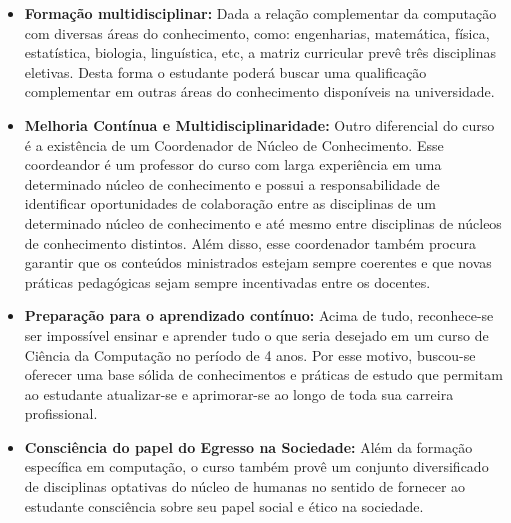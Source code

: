 \begin{itemize}

\item \textbf{Formação multidisciplinar:} Dada a relação complementar da computação com diversas áreas do conhecimento, como: engenharias, matemática, física, estatística, biologia, linguística, etc, a matriz curricular prevê três disciplinas eletivas. Desta forma o estudante poderá buscar uma qualificação complementar em outras áreas do conhecimento disponíveis na universidade.


\item \textbf{Melhoria Contínua e Multidisciplinaridade:} Outro diferencial do curso é a existência de um Coordenador de Núcleo de Conhecimento. Esse coordeandor é um professor do curso com larga experiência em uma determinado núcleo de conhecimento e possui a responsabilidade de identificar oportunidades de colaboração entre as disciplinas de um determinado núcleo de conhecimento e até mesmo entre disciplinas de núcleos de conhecimento distintos. Além disso, esse coordenador também procura garantir que os conteúdos ministrados estejam sempre coerentes e que novas práticas pedagógicas sejam sempre incentivadas entre os docentes.


\item \textbf{Preparação para o aprendizado contínuo:} Acima de tudo, reconhece-se ser impossível ensinar e aprender tudo o que seria desejado em um curso de Ciência da Computação no período de 4 anos. Por esse motivo, buscou-se oferecer uma base sólida de conhecimentos e práticas de estudo que permitam ao estudante atualizar-se e aprimorar-se ao longo de toda sua carreira profissional.

\item \textbf{Consciência do papel do Egresso na Sociedade:} Além da formação específica em computação, o curso também provê um conjunto diversificado de disciplinas optativas do núcleo de humanas no sentido de fornecer ao estudante consciência sobre seu papel social e ético na sociedade. 


\end{itemize}


